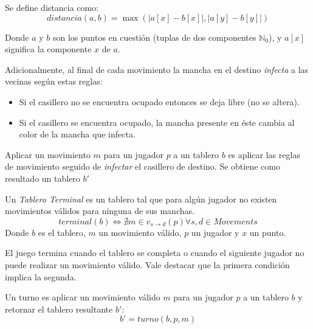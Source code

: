 \documentclass[10pt,a4paper,notitlepage,twocolumn,draft]{article}
\newenvironment{definition}[1][Definición]{\begin{trivlist}
\item[\hskip \labelsep {\bfseries #1}]}{\end{trivlist}}
\begin{document}
\begin{definition}
Se define distancia como:
\begin{equation}
    distancia(a, b) = \max(|a[x] - b[x]|, |a[y] - b[y]|)
\end{equation}

Donde $a$ y $b$ son los puntos en cuestión (tuplas de dos componentes $\mathbb{N}_{0}$), y $a[x]$ significa la componente $x$ de $a$.
\end{definition}

Adicionalmente, al final de cada movimiento la mancha en el destino \textit{infecta} a las vecinas según estas reglas:
\begin{itemize}
\item Si el casillero no se encuentra ocupado entonces se deja libre (no se altera).
\item Si el casillero se encuentra ocupado, la mancha presente en éste cambia al color de la mancha que infecta.
\end{itemize}

\begin{definition}
Aplicar un movimiento $m$ para un jugador $p$ a un tablero $b$ es aplicar las reglas de movimiento seguido de \textit{infectar} el casillero de destino. Se obtiene como resultado un tablero $b'$
\end{definition}

\begin{definition}
Un \textit{Tablero Terminal} es un tablero tal que para algún jugador no existen movimientos válidos para ninguna de sus manchas.
\begin{equation}
terminal(b) \Leftrightarrow \nexists m \in v_{s \rightarrow d}(p) \forall s, d \in Movements
\end{equation}
Donde $b$ es el tablero, $m$ un movimiento válido, $p$ un jugador y $x$ un punto.
\end{definition}

El juego termina cuando el tablero se completa o cuando el siguiente jugador no puede realizar un movimiento válido. Vale destacar que la primera condición implica la segunda.

\begin{definition}
Un turno es aplicar un movimiento válido $m$ para un jugador $p$ a un tablero $b$ y retornar el tablero resultante $b'$:
\begin{equation}
b' = turno(b, p, m)
\end{equation}
\end{definition}
\end{document}
